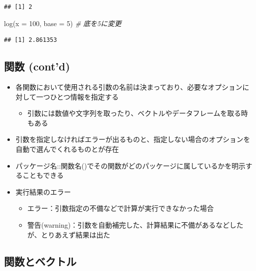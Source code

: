 \documentclass[
]{ltjsarticle}
\newenvironment{Shaded}{\begin{snugshade}}{\end{snugshade}}
\newcommand{\AttributeTok}[1]{\textcolor[rgb]{0.77,0.63,0.00}{#1}}
\newcommand{\CommentTok}[1]{\textcolor[rgb]{0.56,0.35,0.01}{\textit{#1}}}
\newcommand{\DecValTok}[1]{\textcolor[rgb]{0.00,0.00,0.81}{#1}}
\newcommand{\FunctionTok}[1]{\textcolor[rgb]{0.00,0.00,0.00}{#1}}
\newcommand{\NormalTok}[1]{#1}
\providecommand{\tightlist}{%
  \setlength{\itemsep}{0pt}\setlength{\parskip}{0pt}}
\begin{document}
\begin{verbatim}
## [1] 2
\end{verbatim}

\begin{Shaded}
\begin{Highlighting}[]
\FunctionTok{log}\NormalTok{(}\AttributeTok{x =} \DecValTok{100}\NormalTok{, }\AttributeTok{base =} \DecValTok{5}\NormalTok{) }\CommentTok{\# 底を5に変更}
\end{Highlighting}
\end{Shaded}

\begin{verbatim}
## [1] 2.861353
\end{verbatim}

\hypertarget{ux95a2ux6570-contd}{%
\subsection{関数 (cont'd)}\label{ux95a2ux6570-contd}}

\begin{itemize}
\tightlist
\item
  各関数において使用される引数の名前は決まっており、必要なオプションに対して一つひとつ情報を指定する

  \begin{itemize}
  \tightlist
  \item
    引数には数値や文字列を取ったり、ベクトルやデータフレームを取る時もある
  \end{itemize}
\item
  引数を指定しなければエラーが出るものと、指定しない場合のオプションを自動で選んでくれるものとが存在
\item
  パッケージ名::関数名()でその関数がどのパッケージに属しているかを明示することもできる
\item
  実行結果のエラー

  \begin{itemize}
  \tightlist
  \item
    エラー：引数指定の不備などで計算が実行できなかった場合
  \item
    警告(warning)：引数を自動補完した、計算結果に不備があるなどしたが、とりあえず結果は出た
  \end{itemize}
\end{itemize}

\hypertarget{ux95a2ux6570ux3068ux30d9ux30afux30c8ux30eb}{%
\subsection{関数とベクトル}\label{ux95a2ux6570ux3068ux30d9ux30afux30c8ux30eb}}
\end{document}
